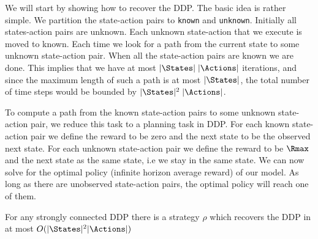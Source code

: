 We will start by showing how to recover the DDP. The basic idea is
rather simple. We partition the state-action pairs to {\tt known}
and {\tt unknown}. Initially all states-action pairs are unknown.
Each unknown state-action that we execute is moved to known. Each
time we look for a path from the current state to some unknown
state-action pair. When all the state-action pairs are known we are
done. This implies that we have at most $|\States|\;|\Actions|$
iterations, and since the maximum length of such a path is at most
$|\States|$, the total number of time steps would be bounded by
$|\States|^2\;|\Actions|$.

To compute a path from the known state-action pairs to some unknown
state-action pair, we reduce this task to a planning task in DDP.
%
For each known state-action pair  we define the reward to be zero and the
next state to be the observed next state. For each unknown
state-action pair we define the reward to be $\Rmax$ and the next state
as the same state, i.e we stay in the same state. We can now solve for the optimal
policy (infinite horizon average reward) of our model. As long as
there are unobserved state-action pairs, the optimal policy will
reach one of them.

\begin{theorem}
For any strongly connected DDP there is a strategy $\rho$ which
recovers the DDP in at most $O(|\States|^2 |\Actions|)$
\end{theorem}

